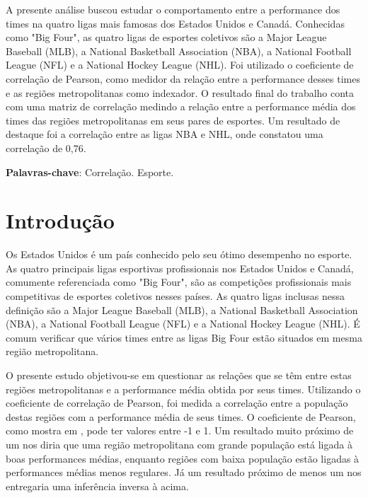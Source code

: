 \documentclass[12pt,oneside,a4paper,chapter=TITLE,english,brazil,sumario=abnt-6027-2012]{abntex2}
\begin{document}
	
\clearpage\maketitle
\thispagestyle{empty}
\setlength{\absparsep}{18pt} 
\begin{resumo}
	
	A presente análise buscou estudar o comportamento entre a performance dos times na quatro ligas mais famosas dos Estados Unidos e Canadá. Conhecidas como "Big Four", as quatro ligas de esportes coletivos são a Major League Baseball (MLB), a National Basketball Association (NBA), a National Football League (NFL) e a National Hockey League (NHL). Foi utilizado o coeficiente de correlação de Pearson, como medidor da relação entre a performance desses times e as regiões metropolitanas como indexador. O resultado final do trabalho conta com uma matriz de correlação medindo a relação entre a performance média dos times das regiões metropolitanas em seus pares de esportes. Um resultado de destaque foi a correlação entre as ligas NBA e NHL, onde constatou uma correlação de 0,76.
	\noindent
	
	\textbf{Palavras-chave}:  Correlação. Esporte.   
\end{resumo}


	
	\tableofcontents*
	\cleardoublepage
	
	
	
	\textual 
	\pagestyle{simple}
	
\chapter{Introdução}

	Os Estados Unidos é um país conhecido pelo seu ótimo desempenho no esporte. As quatro principais ligas esportivas profissionais nos Estados Unidos e Canadá, comumente referenciada como "Big Four", são as competições profissionais mais competitivas de esportes coletivos nesses países. As quatro ligas inclusas nessa definição são a Major League Baseball (MLB), a National Basketball Association (NBA), a National Football League (NFL) e a National Hockey League (NHL). É comum verificar que vários times entre as ligas Big Four estão situados em mesma região metropolitana.
	
	O presente estudo objetivou-se em questionar as relações que se têm entre estas regiões metropolitanas e a performance média obtida por seus times. Utilizando o coeficiente de correlação de Pearson, foi medida a correlação entre a população destas regiões com a performance média de seus times. O coeficiente de Pearson, como mostra em , pode ter valores entre -1 e 1. Um resultado muito próximo de um nos diria que uma região metropolitana com grande população está ligada à boas performances médias, enquanto regiões com baixa população estão ligadas à performances médias menos regulares. Já um resultado próximo de menos um nos entregaria uma inferência inversa à acima.
	
\end{document}
